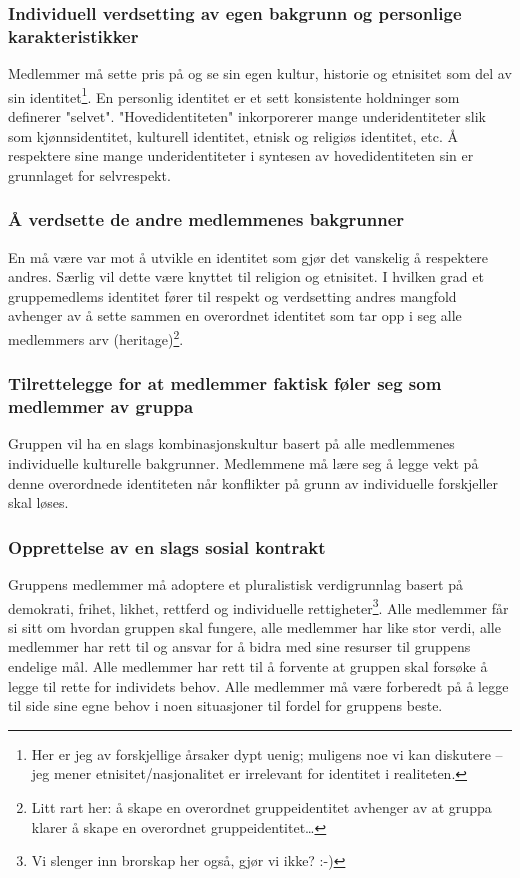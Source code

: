 \documentclass[11pt]{article}
\begin{document}
			\subsubsection{Individuell verdsetting av egen bakgrunn og personlige karakteristikker}
				
				Medlemmer må sette pris på og se sin egen kultur, historie og etnisitet som del av sin identitet\footnote{Her er jeg av forskjellige årsaker dypt uenig; muligens noe vi kan diskutere -- jeg mener etnisitet/nasjonalitet er irrelevant for identitet i realiteten.}. En personlig identitet er et sett konsistente holdninger som definerer "selvet". "Hovedidentiteten" inkorporerer mange underidentiteter slik som kjønnsidentitet, kulturell identitet, etnisk og religiøs identitet, etc. Å respektere sine mange underidentiteter i syntesen av hovedidentiteten sin er grunnlaget for selvrespekt.
				
			\subsubsection{Å verdsette de andre medlemmenes bakgrunner}
				
				En må være var mot å utvikle en identitet som gjør det vanskelig å respektere andres. Særlig vil dette være knyttet til religion og etnisitet. I hvilken grad et gruppemedlems identitet fører til respekt og verdsetting andres mangfold avhenger av å sette sammen en overordnet identitet som tar opp i seg alle medlemmers arv (heritage)\footnote{Litt rart her: å skape en overordnet gruppeidentitet avhenger av at gruppa klarer å skape en overordnet gruppeidentitet\dots}.
				
			\subsubsection{Tilrettelegge for at medlemmer faktisk føler seg som medlemmer av gruppa}
			
				Gruppen vil ha en slags kombinasjonskultur basert på alle medlemmenes individuelle kulturelle bakgrunner. Medlemmene må lære seg å legge vekt på denne overordnede identiteten når konflikter på grunn av individuelle forskjeller skal løses.
				
			\subsubsection{Opprettelse av en slags sosial kontrakt}
			
				Gruppens medlemmer må adoptere et pluralistisk verdigrunnlag basert på demokrati, frihet, likhet, rettferd og individuelle rettigheter\footnote{Vi slenger inn brorskap her også, gjør vi ikke? :-)}. Alle medlemmer får si sitt om hvordan gruppen skal fungere, alle medlemmer har like stor verdi, alle medlemmer har rett til og ansvar for å bidra med sine resurser til gruppens endelige mål. Alle medlemmer har rett til å forvente at gruppen skal forsøke å legge til rette for individets behov. Alle medlemmer må være forberedt på å legge til side sine egne behov i noen situasjoner til fordel for gruppens beste. 
				
\end{document}
